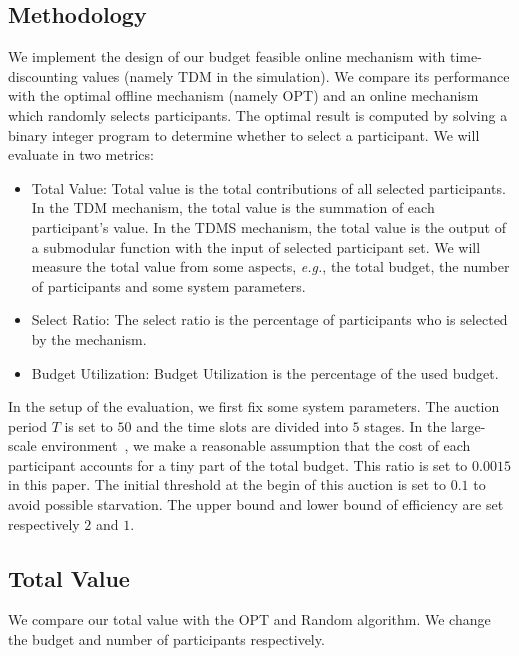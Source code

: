 \documentclass[conference,compsocconf,letterpaper,10pt]{IEEEtran}
\newcommand{\eg}{{\em e.g.}}
\begin{document}
\subsection{Methodology}
We implement the design of our budget feasible online mechanism with time-discounting values (namely TDM in the simulation). We compare its performance with the optimal offline mechanism (namely OPT) and an online mechanism which randomly selects participants. The optimal result is computed by solving a binary integer program to determine whether to select a participant. We will evaluate in two metrics:
\begin{itemize}
\item Total Value: Total value is the total contributions of all selected participants. In the TDM mechanism, the total value is the summation of each participant's value. In the TDMS mechanism, the total value is the output of a submodular function with the input of selected participant set. We will measure the total value from some aspects, \eg, the total budget, the number of participants and some system parameters.

\item Select Ratio: The select ratio is the percentage of participants who is selected by the mechanism.

\item Budget Utilization: Budget Utilization is the percentage of the used budget.
\end{itemize}
In the setup of the evaluation, we first fix some system parameters. The auction period $T$ is set to $50$ and the time slots are divided into $5$ stages. In the large-scale environment~\cite{6979011}, we make a reasonable assumption that the cost of each participant accounts for a tiny part of the total budget. This ratio  is set to $0.0015$ in this paper. The initial threshold at the begin of this auction is set to $0.1$ to avoid possible starvation. The upper bound and lower bound of efficiency are set respectively $2$ and $1$.
\subsection{Total Value}
We compare our total value with the OPT and Random algorithm. We change the budget and number of participants respectively.
\end{document}
